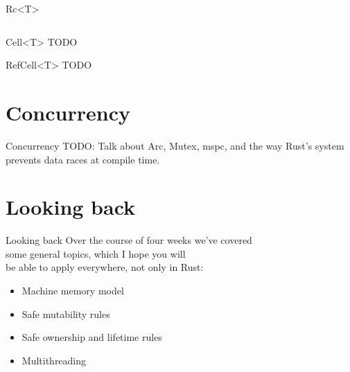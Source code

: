 \documentclass[usenames,dvipsnames,10pt,aspectratio=169]{beamer}
\begin{document}
\begin{frame}{Rc<T>}
	\inputminted[fontsize=\normalsize]{rust}{code/rc1.rs}
	\vspace{0.4cm}
\end{frame}

\begin{frame}{Cell<T>}
	\large
	\textcolor{ucured}{TODO}
\end{frame}

\begin{frame}{RefCell<T>}
	\large
	\textcolor{ucured}{TODO}
\end{frame}


\section{Concurrency}

\begin{frame}{Concurrency}
	\large
	\textcolor{ucured}{TODO: Talk about Arc, Mutex,
	mspc, and the way Rust's system prevents data races at compile
time.}
\end{frame}


\section{Looking back}

\begin{frame}{Looking back}
	\large
	Over the course of four weeks we've covered\\
	some general topics, which I hope you will\\
	be able to apply everywhere, not only in Rust:\\
	\vspace{0.1cm}
\begin{itemize}[label=$\bullet$]
	\item Machine memory model
	\item Safe mutability rules
	\item Safe ownership and lifetime rules
	\item Multithreading
\end{itemize}
	
\end{frame}
\end{document}
